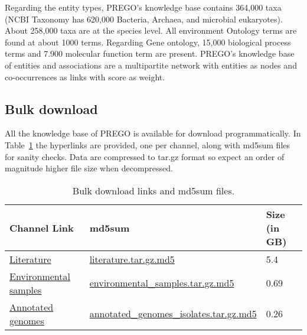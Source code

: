 Regarding the entity types, PREGO's knowledge base contains 364,000 taxa
(NCBI Taxonomy has 620,000 Bacteria, Archaea, and microbial eukaryotes). 
About 258,000 taxa are at the species level. 
All environment Ontology terms are found at about 1000 terms. Regarding Gene ontology, 15,000 biological process terms and 7.900 molecular function term are present.
PREGO's knowledge base of entities and associations are a multipartite network
with entities as nodes and co-occurrences as links with score as weight.

\subsection{Bulk download}
\label{bulk-download}

All the knowledge base of PREGO is available for download programmatically.
In Table~\ref{table:prego-appD-1} the hyperlinks are provided, one per channel, along with md5sum files for sanity checks.
Data are compressed to tar.gz format so expect an order of magnitude higher file size when decompressed.

   \begin{table}[ht]
      

      \begin{tabular}{lll}
      \toprule
      Channel Link & md5sum & Size (in GB) \\ \midrule

      \href{https://prego.hcmr.gr/download/literature.tar.gz}{Literature} & \href{https://prego.hcmr.gr/download/literature.tar.gz.md5}{literature.tar.gz.md5} & 5.4 \\

      \href{https://prego.hcmr.gr/download/environmental\_samples.tar.gz}{Environmental samples} & 
      \href{https://prego.hcmr.gr/download/environmental\_samples.tar.gz.md5}{environmental\_samples.tar.gz.md5}
      & 0.69 \\

      \href{https://prego.hcmr.gr/download/annotated\_genomes\_isolates.tar.gz}{Annotated genomes} &
      \href{https://prego.hcmr.gr/download/annotated\_genomes\_isolates.tar.gz.md5}{annotated\_genomes\_isolates.tar.gz.md5} & 0.26 \\ \bottomrule
      \end{tabular}
      \caption[PREGO Bulk download.]{Bulk download links and md5sum files.}
      \label{table:prego-appD-1}
   \end{table}

